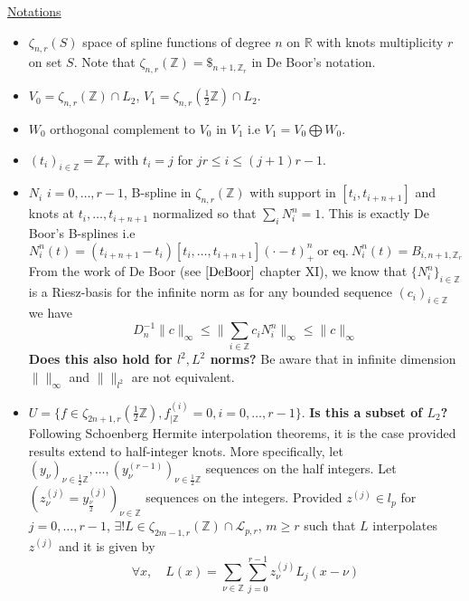 \documentclass[a4paper, 11pt]{article}
\begin{document}
\underline{Notations}
\begin{itemize}
  \itemsep0em
  \item $\zeta_{n,r}(S)$ space of spline functions of degree $n$ on $\mathbb{R}$ with knots multiplicity $r$ on set $S$.  
    Note that $\zeta_{n, r}(\mathbb{Z}) = \$_{n+1, \mathbb{Z}_r}$ in De Boor's notation.
  \item $V_0 = \zeta_{n, r}(\mathbb{Z}) \cap L_2$, $V_1 = \zeta_{n, r}(\frac{1}{2}\mathbb{Z}) \cap L_2$.
  \item $W_0$ orthogonal complement to $V_0$ in $V_1$ i.e $V_1 = V_0 \bigoplus W_0$.
  \item ${(t_i)}_{i \in \mathbb{Z}} = \mathbb{Z}_r$ with $t_i = j$ for $jr \leq i \leq (j+1)r-1$.
  \item $N_i$ $i=0, \ldots, r-1$, B-spline in $\zeta_{n, r}(\mathbb{Z})$ with support in $[t_i, t_{i+n+1}]$ and knots at 
    $t_i, \ldots, t_{i+n+1}$ normalized so that $\sum_i N_i^n = 1$. This is exactly De Boor's B-splines i.e
    \begin{equation*}
      N_i^n(t) = (t_{i+n+1}-t_i) [t_i,  \ldots, t_{i+n+1}] {(\cdot - t)}_+^{n} \ \text{or eq.} \ N_i^n(t) = B_{i, n+1, 
      \mathbb{Z}_r}
    \end{equation*}
    From the work of De Boor (see $\cite{DeBoor}$ chapter XI), we know that ${\{N_i^n\}}_{i \in \mathbb{Z}}$ is a 
    Riesz-basis for the infinite norm as for any bounded sequence ${(c_i)}_{i \in \mathbb{Z}}$ we have
    \begin{equation*}
      D_n^{-1} \|c\|_{\infty} \leq \|\sum_{i \in \mathbb{Z}} c_i N_i^n \|_{\infty} \leq \|c\|_{\infty}
    \end{equation*}
    \textbf{Does this also hold for $l^2, L^2$ norms?} Be aware that in infinite dimension $\|\|_{\infty}$ and 
    $\|\|_{l^2}$ are not equivalent.
  \item $U = \{f \in \zeta_{2n+1,r}(\frac{1}{2}\mathbb{Z}), f^{(i)}_{|\mathbb{Z}} = 0, i=0, \ldots, r-1\}$. \textbf{Is 
    this a subset of $L_2$?} Following Schoenberg Hermite interpolation theorems, it is the case provided results extend 
    to half-integer knots. More specifically, let ${(y_{\nu})}_{\nu \in \frac{1}{2}\mathbb{Z}}, \ldots, 
    {(y^{(r-1)}_{\nu})}_{\nu \in \frac{1}{2}\mathbb{Z}}$ sequences on the half integers. Let ${(z^{(j)}_{\nu} = 
    y^{(j)}_{\frac{\nu}{2}})}_{\nu \in \mathbb{Z}}$ sequences on the integers. Provided $z^{(j)} \in l_p$ for $j=0,
    \ldots, r-1$, $\exists! L \in \zeta_{2m-1, r}(\mathbb{Z}) \cap \mathcal{L}_{p,r}$, $m \geq r$ such that $L$ 
    interpolates $z^{(j)}$ and it is given by
    \begin{equation*}
      \forall x, \quad L(x) = \sum_{\nu \in \mathbb{Z}} \sum_{j=0}^{r-1} z^{(j)}_{\nu} L_{j}(x-\nu)
    \end{equation*}


\end{itemize}
\end{document}
